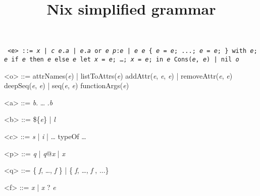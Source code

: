 \documentclass{article}
\title{Nix simplified grammar}
\date{}
\newcommand{\meta}[1]{\emph{\textsl{#1}}} %
\renewcommand{\|}{\textrm{|}}
\def\e/{\meta{e}}
\def\a/{\meta{a}}
\def\b/{\meta{b}}
\def\c/{\meta{c}}
\def\p/{\meta{p}}
\def\q/{\meta{q}}
\def\f/{\meta{f}}
\def\x/{\meta{x}}
\def\o/{\meta{o}}
\begin{document}
\maketitle{}

\begin{grammar}
  \tt
<e> ::=
    \x/ \| \c/
  \alt \e/.\a/ \| \e/.\a/ or \e/
  \alt \p/:\e/ \| \e/ \e/
  \alt \{ \e/ = \e/; ...; \e/ = \e/; \}
  \alt with \e/; \e/
  \alt if \e/ then \e/ else \e/
  \alt let \x/ = \e/; \ldots{;} \x/ = \e/; in \e/
  \alt Cons(\e/, \e/) \| nil
  \alt \o/

  <o> ::= attrNames(\e/) \| listToAttrs(\e/)
  \alt addAttr(\e/, \e/, \e/) \| removeAttr(\e/, \e/)
  \alt deepSeq(\e/, \e/) \| seq(\e/, \e/)
  \alt functionArgs(\e/)

<a> ::= \b/. \ldots{} .\b/

<b> ::= \$\{\e/\} \| \meta{l}

<c> ::= \meta{s} \| \meta{i} \| \ldots{}
  \alt typeOf
  \alt \ldots{}

<p> ::= \q/ \| \q/@\x/ \| \x/

<q> ::= \{ \f/, \ldots{,} \f/ \} \| \{ \f/, \ldots{,} \f/ , ...\}

<f> ::= \x/ \| \x/ ? \e/

\end{grammar}
\end{document}
